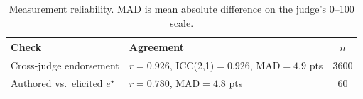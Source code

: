 \begin{table}[t]
\centering
\caption{Measurement reliability. MAD is mean absolute difference on the judge's 0--100 scale.}
\label{tab:reliability}
\begin{tabular}{llc}
\toprule
Check & Agreement & $n$ \\
\midrule
Cross-judge endorsement & $r=0.926$, ICC(2,1)$=0.926$, MAD$=4.9$ pts & 3600 \\
Authored vs.\ elicited $e^{\star}$ & $r=0.780$, MAD$=4.8$ pts & 60 \\
\bottomrule
\end{tabular}
\end{table}
